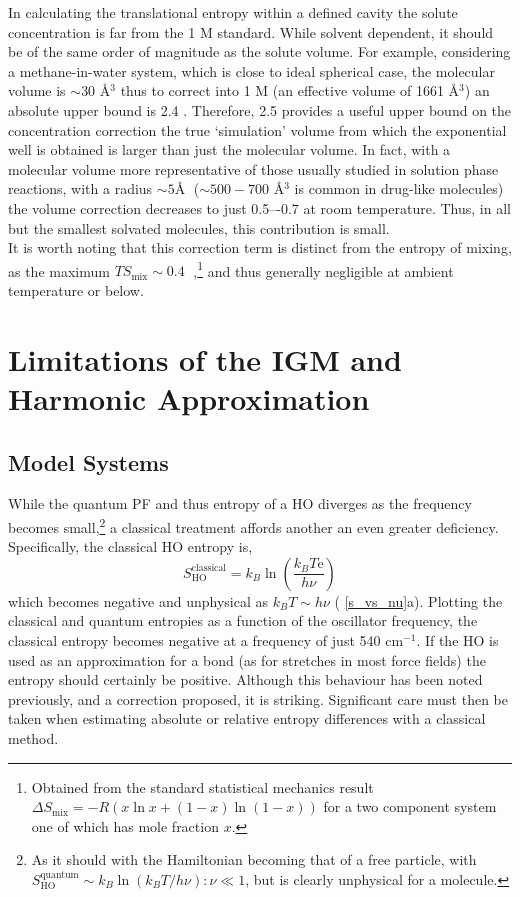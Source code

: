\documentclass[../main.tex]{subfiles}
\begin{document}
In calculating the translational entropy within a defined cavity the solute concentration is far from the 1 M standard. While solvent dependent, it should be of the same order of magnitude as the solute volume. For example, considering a methane-in-water system, which is close to ideal spherical case, the molecular volume is $\sim 30$ \AA$^3$\cite{Zhao2003} thus to correct into 1 M (an effective volume of 1661 \AA$^3$) an absolute upper bound is 2.4 \kcal. 
Therefore, 2.5 \kcalx provides a useful upper bound on the concentration correction the true `simulation' volume from which the exponential well is obtained is larger than just the molecular volume. In fact, with a molecular volume more representative of those usually studied in solution phase reactions, with a radius $\sim 5 $\AA$\;$  ($\sim 500-700$ \AA$^3$ is common in drug-like molecules\cite{Khanna2009}) the volume correction decreases to just 0.5–-0.7 \kcalx at room temperature. Thus, in all but the smallest solvated molecules, this contribution is small.
\\
It is worth noting that this correction term is distinct from the entropy of mixing, as the maximum $TS_\text{mix} \sim 0.4\;$ \kcal,\footnote{Obtained from the standard statistical mechanics result $\Delta S_\text{mix} = -R(x \ln x + (1-x)\ln(1 - x))$ for a two component system one of which has mole fraction $x$.}  and thus generally negligible at ambient temperature or below.


\section{Limitations of the IGM and Harmonic Approximation}
\subsection{Model Systems}

While the quantum PF and thus entropy of a HO diverges as the frequency becomes small,\footnote{As it should with the Hamiltonian becoming that of a free particle, with $S_\text{HO}^\text{quantum} \sim k_B\ln(k_B T/h\nu) : \nu \ll 1$, but is clearly unphysical for a molecule.} a classical treatment affords another an even greater deficiency. Specifically, the classical HO entropy is,
\begin{equation}
S^\text{classical}_\text{HO} = k_B \ln\left(\frac{k_BT\text{e}}{h\nu}\right)
\end{equation}
which becomes negative and unphysical as $k_BT \sim h\nu$ (\figurename{ \ref{s_vs_nu}a}). Plotting the classical and quantum entropies as a function of the oscillator frequency, the classical entropy becomes negative at a frequency of just 540 cm$^{-1}$. If the HO is used as an approximation for a bond (as for stretches in most force fields) the entropy should certainly be positive. Although this behaviour has been noted previously, and a correction proposed,\cite{Schlitter1993} it is striking. Significant care must then be taken when estimating absolute or relative entropy differences with a classical method.
\end{document}
